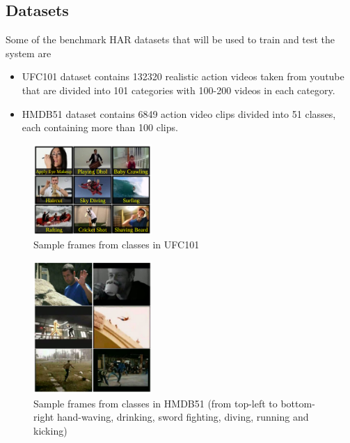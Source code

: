 \documentclass[twocolumn]{article}
\begin{document}
\subsection{Datasets}
Some of the benchmark HAR datasets that will be used to train and test the system are
\begin{itemize}
    \item \cite{b11} UFC101 dataset contains 132320 realistic action videos taken from youtube that are divided into 101 categories with 100-200 videos in each category.
    \item \cite{b12} HMDB51 dataset contains 6849 action video clips divided into 51 classes, each containing more than 100 clips.
\end{itemize}
\begin{figure}
    \center
    \includegraphics[width=0.4\textwidth]{UFC 101.png}
    \caption{Sample frames from classes in UFC101 \cite{b11}}
    \center
\end{figure}
\begin{figure}
    \center
    \includegraphics[width=0.4\textwidth]{HMDB51.png}
    \caption{Sample frames from classes in HMDB51 (from top-left to bottom-right hand-waving, drinking, sword fighting, diving, running and kicking)\cite{b12}}
    \center
\end{figure}
\end{document}

